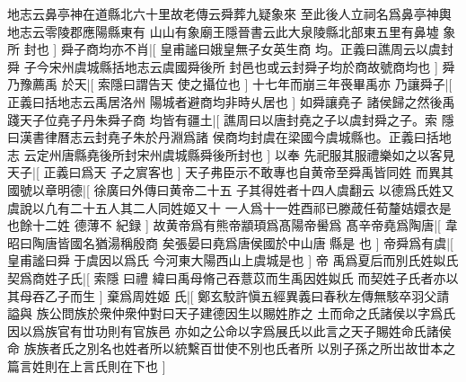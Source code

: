 地志云鼻亭神在道縣北六十里故老傳云舜葬九疑象來%
%
至此後人立祠名爲鼻亭神輿地志云零陵郡應陽縣東有%
山山有象廟王隱晉書云此大泉陵縣北部東五里有鼻墟%
%
象所%
封也%
]%
舜子商均亦不肖|[%
皇甫謐曰娥皇無子女英生商%
均。正義曰譙周云以虞封舜%
%
子今宋州虞城縣括地志云虞國舜後所%
封邑也或云封舜子均於商故號商均也%
]%
舜乃豫薦禹%
於天|[%
索隱曰謂告天%
使之攝位也%
]%
十七年而崩三年䘮畢禹亦%
乃讓舜子|[%
正義曰括地志云禹居洛州%
陽城者避商均非時乆居也%
]%
如舜讓堯子%
諸侯歸之然後禹踐天子位堯子丹朱舜子商%
均皆有疆土|[%
譙周曰以唐封堯之子以虞封舜之子。索%
隱曰漢書律曆志云封堯子朱於丹淵爲諸%
%
侯商均封虞在梁國今虞城縣也。正義曰括地志%
云定州唐縣堯後所封宋州虞城縣舜後所封也%
]%
以奉%
先祀服其服禮樂如之以客見天子|[%
正義曰爲天%
子之賔客也%
]%
天子弗臣示不敢專也自黄帝至舜禹皆同姓%
而異其國號以章明德|[%
徐廣曰外傳曰黄帝二十五%
子其得姓者十四人虞翻云%
%
以德爲氏姓又虞說以凢有二十五人其二人同姓姬又十%
一人爲十一姓酉祁已滕葴任荀釐姞嬛衣是也餘十二姓%
%
德薄不%
紀録%
]%
故黄帝爲有熊帝顓頊爲髙陽帝嚳爲%
髙辛帝堯爲陶唐|[%
韋昭曰陶唐皆國名猶湯稱殷商%
矣張晏曰堯爲唐侯國於中山唐%
%
縣是%
也%
]%
帝舜爲有虞|[%
皇甫謐曰舜𡣕于虞因以爲氏%
今河東大陽西山上虞城是也%
]%
帝%
禹爲夏后而別氏姓姒氏契爲商姓子氏|[%
索隱%
曰禮%
%
緯曰禹母脩己吞薏苡而生禹因姓姒氏%
而契姓子氏者亦以其母吞乙子而生%
]%
棄爲周姓姬%
氏|[%
鄭玄駮許愼五經異義曰春秋左傳無駭卒羽父請謚與%
族公問族於衆仲衆仲對曰天子建德因生以賜姓胙之%
%
土而命之氏諸侯以字爲氏因以爲族官有丗功則有官族邑%
亦如之公命以字爲展氏以此言之天子賜姓命氏諸侯命%
%
族族者氏之別名也姓者所以統繫百丗使不別也氏者所%
以別子孫之所岀故丗本之篇言姓則在上言氏則在下也%
]%
